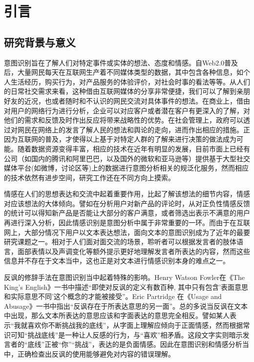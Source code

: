 \chapter{引言}
\label{cha:intro}


\section{研究背景与意义}

意图识别旨在了解人们对特定事件或实体的想法、态度和情感。自Web2.0普及后，大量网民每天在互联网生产着不同媒体类型的数据，其中包含各种信息，如个人生活经历，购买行为，对产品服务的体验评价，对社会时事的看法等等。从人们的日常社交需求来看，这种借由互联网媒体的分享非常便捷，我们可以了解到亲朋好友的近况，也或者随时和不认识的网民交流对具体事件的想法。在商业上，借由对用户的网络行为进行分析，企业可以对应客户或者潜在客户有更深入的了解，对他们的需求和反馈及时作出反应将带来战略性的优势。在社会管理上，政府可以透过对网民在网络上的发言了解人民的想法和舆论的走向，进而作出相应的措施。正因为互联网的普及，才使得以上基于对特定人群的了解来进行决策的做法成为可能。随着数据资源变得丰富，相应的技术在近年有明显的发展，目前市面上已经有公司（如国内的腾讯和阿里巴巴，以及国外的微软和亚马逊等）提供基于大型社交媒体平台(如微博，讨论区等)上的数据进行意图分析相关的规泛化服务，然而相应的技术依然有进步空间，研究工作还在不同方向上摸索。

情感在人们的思想表达和交流中起着重要作用\cite{Banerjee2015Detection}，比起了解该想法的细节内容，情感对应该想法的大体倾向。譬如在分析用户对新产品的评论时，从对正负性情感反馈的统计可以得知新产品是否能让大部分的客户满意，或者筛选出表示不满意的用户再进行深入分析，因此情感识别是意图分析中属于非常重要的一环。而由于在互联网上，大部分情况下用户以文本表达想法，面向文本的意图识别成为了近年的最要研究课题之一。相对于人们面对面交流的场景，聆听者可以根据发言者的肢体语言，面部表情以及声调变化等额外提示更好地理解发言者所表达的内容，然而这些信息并不存在于文本当中，这也正是对文本进行情感识别本身的难点之一\cite{SemEval2019Task3}。

反讽的修辞手法在意图识别当中起着特殊的影响。Henry Watson Fowler在《The King's English》一书中描述“即使对反讽的定义有数百种, 其中只有包含'表面意思和实际意思不同'这个概念的才能被接受”。Eric Partridge 在《Usage and Abusage》一书中指出“反讽存在于所表达意思的另一面”。总的多说当反讽在文本中出现，那么文本所表达的意思应该和字面表达的意思完全相反。譬如某人表示“我就喜欢你不断挑战我的底线”，从字面上理解应倾向于正面情感，然而根据常识可知“挑战底线”是一种让人反感的行为，与“喜欢”相矛盾。这段文字实则暗示发言者的“底线”正被“你”“挑战”，表达的是负面情感。因此在意图识别和情感分析当中，正确检查出反讽的使用能够避免对内容的错误理解。

